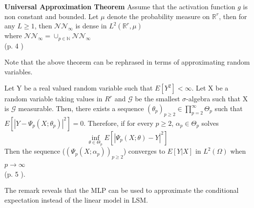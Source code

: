 \begin{theorem}\label{UniversalApproxTheorem}
\textbf{Universal Approximation Theorem} Assume that the activation function $g$ is non constant and bounded. Let $\mu$ denote the probability measure on $\mathbb{R}^r$, then for any $L\geq 1$, then $\mathcal{N} \mathcal{N}_\infty$ is dense in $L^2(\mathbb{R}^r, \mu)$\\
where $\mathcal{N} \mathcal{N}_\infty= \cup_{p\in \mathbb{N}} \mathcal{N} \mathcal{N}_\infty$\\
\null \hfill (p. 4 \parencite{Lelong19})
\end{theorem}
Note that the above theorem can be rephrased in terms of approximating random variables.
\begin{remark}
Let Y be a real valued random variable such that $E[Y^2]< \infty$. Let X be a random variable taking values in $R^r$ and $\mathcal{G}$ be the smallest $\sigma$-algebra such that X is $\mathcal{G}$ measurable. Then, there exists a sequence $(\theta_p)_{p\geq 2} \in \prod_{p=2}^{\infty} \Theta_{p}$ such that $E[|Y-\Psi_p(X;\theta_p)|^2]=0$. Therefore, if for every $p \geq 2$, $\alpha_p \in \Theta_p$ solves
$$\inf_{\theta\in \Theta_p} E[|\Psi_p(X;\theta)-Y|^2]$$
Then the sequence ($(\Psi_p(X;\alpha_p))_{p\geq 2}$) converges to $E[Y|X]$ in $L^2(\Omega)$ when $p \to \infty$ \\
\null \hfill (p. 5 \parencite{Lelong19}).
\end{remark}
The remark reveals that the MLP can be used to approximate the conditional expectation instead of the linear model in LSM.

